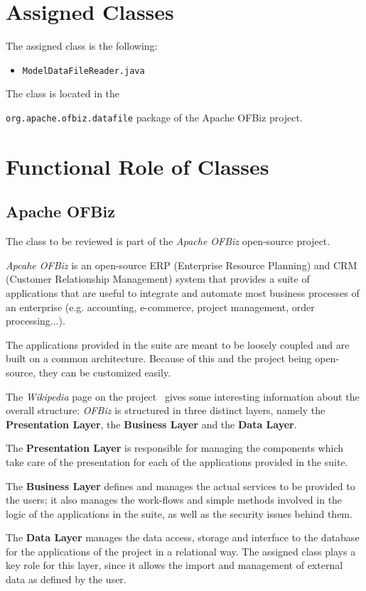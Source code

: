 \section{Assigned Classes}
The assigned class is the following:
\begin{itemize}
\item \texttt{ModelDataFileReader.java}
\end{itemize}

\noindent
The class is located in the {\texttt{org.apache.ofbiz.datafile} package of the Apache OFBiz project.

\section{Functional Role of Classes}
\subsection{Apache OFBiz}
The class to be reviewed is part of the \textit{Apache OFBiz} open-source project.

\textit{Apcahe OFBiz} is an open-source ERP (Enterprise Resource Planning) and CRM (Customer Relationship Management) system that provides a suite of applications that are useful to integrate and automate most business processes of an enterprise (e.g. accounting, e-commerce, project management, order processing...).

The applications provided in the suite are meant to be loosely coupled and are built on a common architecture. Because of this and the project being open-source, they can be customized easily.

The \textit{Wikipedia} page on the project~\cite{wiki_ofbiz} gives some interesting information about the overall structure: \textit{OFBiz} is structured in three distinct layers, namely the \textbf{Presentation Layer}, the \textbf{Business Layer} and the \textbf{Data Layer}.

The \textbf{Presentation Layer} is responsible for managing the components which take care of the presentation for each of the applications provided in the suite.

\noindent
The \textbf{Business Layer} defines and manages the actual services to be provided to the users; it also manages the work-flows and simple methods involved in the logic of the applications in the suite, as well as the security issues behind them.

\noindent
The \textbf{Data Layer} manages the data access, storage and interface to the database for the applications of the project in a relational way. The assigned class plays a key role for this layer, since it allows the import and management of external data as defined by the user.

}
